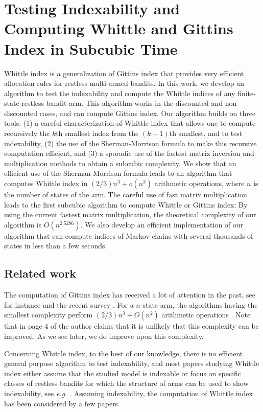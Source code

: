 \chapter{Testing Indexability and Computing Whittle and Gittins Index in Subcubic Time}
\label{ch:index_computation}

Whittle index is a generalization of Gittins index that provides very efficient allocation rules for restless multi-armed bandits. In this work, we develop an algorithm to test the indexability and compute the Whittle indices of any finite-state restless bandit arm. This algorithm works in the discounted and non-discounted cases, and can compute Gittins index. Our algorithm builds on three tools: (1) a careful characterization of Whittle index that allows one to compute recursively the $k$th smallest index from the $(k-1)$th smallest, and to test indexability, (2) the use of the Sherman-Morrison formula to make this recursive computation efficient, and (3) a sporadic use of the fastest matrix inversion and multiplication methods to obtain a subcubic complexity. We show that an efficient use of the Sherman-Morrison formula leads to an algorithm that computes Whittle index in $(2/3)n^3 + o(n^3)$ arithmetic operations, where $n$ is the number of states of the arm.  The careful use of fast matrix multiplication leads to the first subcubic algorithm to compute Whittle or Gittins index: By using the current fastest matrix multiplication, the theoretical complexity of our algorithm is $O(n^{2.5286})$. We also develop an efficient implementation of our algorithm that can compute indices of Markov chains with several thousands of states in less than a few seconds.

\section{Related work}

The computation of Gittins index has received a lot of attention in the past, see for instance \cite{chen1986linear, katehakis1987multi, nino20072, sonin2008generalized} and the recent survey \citep{chakravorty2014multi}. For a $n$-state arm, the algorithms having the smallest complexity perform $(2/3)n^3+O(n^2)$ arithmetic operations \cite{chakravorty2014multi}. Note that in page $4$ of \citep{nino2020fast} the author claims that it is unlikely that this complexity can be improved. As we see later, we do improve upon this complexity. 

Concerning Whittle index, to the best of our knowledge, there is no efficient general purpose algorithm to test indexability, and most papers studying Whittle index either assume that the studied model is indexable or focus on specific classes of restless bandits for which the structure of arms can be used to show indexability, see \emph{e.g.} \cite{aalto2011properties,akbarzadeh2019restless,akbarzadeh2021maintenance,borkar2017whittle}.  Assuming indexability, the computation of Whittle index has been considered by a few papers.

